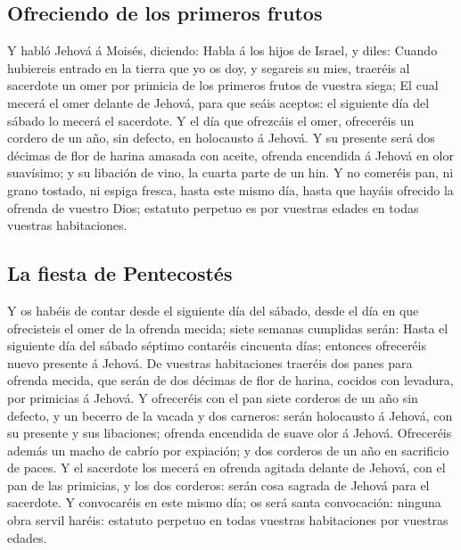 \hypertarget{ofreciendo-de-los-primeros-frutos}{%
\subsection{Ofreciendo de los primeros
frutos}\label{ofreciendo-de-los-primeros-frutos}}

 Y habló Jehová á Moisés, diciendo:  Habla á
los hijos de Israel, y diles: Cuando hubiereis entrado en la tierra que
yo os doy, y segareis su mies, traeréis al sacerdote un omer por
primicia de los primeros frutos de vuestra siega;  El cual
mecerá el omer delante de Jehová, para que seáis aceptos: el siguiente
día del sábado lo mecerá el sacerdote.  Y el día que
ofrezcáis el omer, ofreceréis un cordero de un año, sin defecto, en
holocausto á Jehová.  Y su presente será dos décimas de
flor de harina amasada con aceite, ofrenda encendida á Jehová en olor
suavísimo; y su libación de vino, la cuarta parte de un hin.
 Y no comeréis pan, ni grano tostado, ni espiga fresca,
hasta este mismo día, hasta que hayáis ofrecido la ofrenda de vuestro
Dios; estatuto perpetuo es por vuestras edades en todas vuestras
habitaciones.

\hypertarget{la-fiesta-de-pentecostuxe9s}{%
\subsection{La fiesta de
Pentecostés}\label{la-fiesta-de-pentecostuxe9s}}

 Y os habéis de contar desde el siguiente día del sábado,
desde el día en que ofrecisteis el omer de la ofrenda mecida; siete
semanas cumplidas serán:  Hasta el siguiente día del sábado
séptimo contaréis cincuenta días; entonces ofreceréis nuevo presente á
Jehová.  De vuestras habitaciones traeréis dos panes para
ofrenda mecida, que serán de dos décimas de flor de harina, cocidos con
levadura, por primicias á Jehová.  Y ofreceréis con el pan
siete corderos de un año sin defecto, y un becerro de la vacada y dos
carneros: serán holocausto á Jehová, con su presente y sus libaciones;
ofrenda encendida de suave olor á Jehová.  Ofreceréis
además un macho de cabrío por expiación; y dos corderos de un año en
sacrificio de paces.  Y el sacerdote los mecerá en ofrenda
agitada delante de Jehová, con el pan de las primicias, y los dos
corderos: serán cosa sagrada de Jehová para el sacerdote. 
Y convocaréis en este mismo día; os será santa convocación: ninguna obra
servil haréis: estatuto perpetuo en todas vuestras habitaciones por
vuestras edades.

